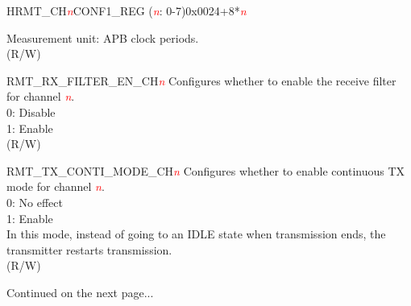 \begin{register}{H}{RMT\_CH\textcolor{red}{\it{n}}CONF1\_REG (\textcolor{red}{\it{n}}: 0-7)}{0x0024+8*\textcolor{red}{\it{n}}}
\begin{regdesc}
\begin{reglist}
Measurement unit: APB clock periods.\\ (R/W)
\item [RMT\_RX\_FILTER\_EN\_CH\textcolor{red}{\it{n}}] Configures whether to enable the receive filter for channel \textcolor{red}{\it{n}}.\\
0: Disable\\
1: Enable\\ (R/W)
\item [RMT\_TX\_CONTI\_MODE\_CH\textcolor{red}{\it{n}}] Configures whether to enable continuous TX mode for channel \textcolor{red}{\it{n}}.\\
0: No effect\\
1: Enable\\
In this mode, instead of going to an IDLE state when transmission ends, the transmitter restarts transmission.\\ (R/W)

\item [Continued on the next page...]
\end{reglist}\end{regdesc}
\end{register}
\addtocounter{Regfloat}{-1}
